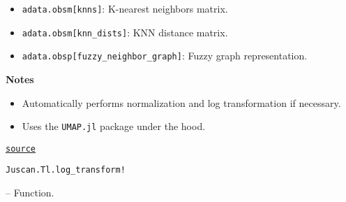 \documentclass[oneside]{memoir}
\begin{document}
\begin{adjustwidth}{2em}{0pt}
\begin{itemize}
\item \texttt{adata.obsm[{\textquotedbl}knns{\textquotedbl}]}: K-nearest neighbors matrix.


\item \texttt{adata.obsm[{\textquotedbl}knn\_dists{\textquotedbl}]}: KNN distance matrix.


\item \texttt{adata.obsp[{\textquotedbl}fuzzy\_neighbor\_graph{\textquotedbl}]}: Fuzzy graph representation.

\end{itemize}
\textbf{Notes}

\begin{itemize}
\item Automatically performs normalization and log transformation if necessary.


\item Uses the \texttt{UMAP.jl} package under the hood.

\end{itemize}


\href{https://github.com/zehua0417/Juscan.jl/blob/393ad1b827b678ea98a738f92af658ee9ed9a403/src/tools/pca.jl#L87-L116}{\texttt{source}}


\end{adjustwidth}
\hypertarget{12413337518650944741}{\texttt{Juscan.Tl.log\_transform!}}  -- {Function.}
\end{document}
